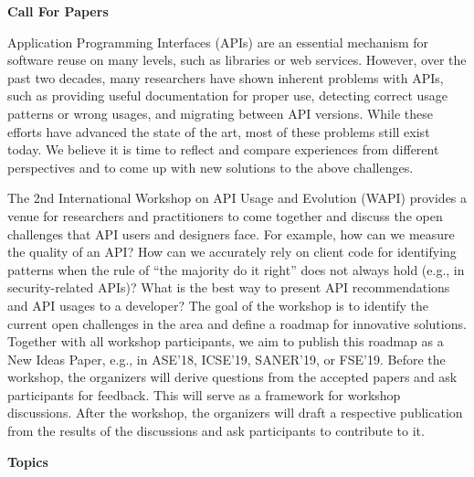 \documentclass[10pt, conference]{IEEEtran}
\newcommand{\updated}[1]{#1}
\newcommand{\shortname}{WAPI}
\begin{document}



\newpage
\onecolumn

\begin{center}
\Large{\textbf{Call For Papers}}
\end{center}

Application Programming Interfaces (APIs) are an essential mechanism for software reuse on many levels, such as libraries or web services. However, over the past two decades, many researchers have shown inherent problems with APIs, such as providing useful documentation for proper use, detecting correct usage patterns or wrong usages, and migrating between API versions. While these efforts have advanced the state of the art, most of these problems still exist today. We believe it is time to reflect and compare experiences from different perspectives and to come up with new solutions to the above challenges. 

The 2nd International Workshop on API Usage and Evolution (\shortname{}) provides a venue for researchers and practitioners to come together and discuss the open challenges that API users and designers face. For example, how can we measure the quality of an API\@? How can we accurately rely on client code for identifying patterns when the rule of ``the majority do it right'' does not always hold (e.g., in security-related APIs)? What is the best way to present API recommendations and API usages to a developer?
%
\updated{The goal of the workshop is to identify the current open challenges in the area and define a roadmap for innovative solutions. Together with all workshop participants, we aim to publish this roadmap as a New Ideas Paper, e.g., in ASE'18, ICSE'19, SANER'19, or FSE'19.
Before the workshop, the organizers will derive questions from the accepted papers and ask participants for feedback. This will serve as a framework for workshop discussions. After the workshop, the organizers will draft a respective publication from the results of the discussions and ask participants to contribute to it.}


\vspace{0.2cm}

\noindent
\textbf{\large Topics}
\vspace{0.2cm}
\end{document}
